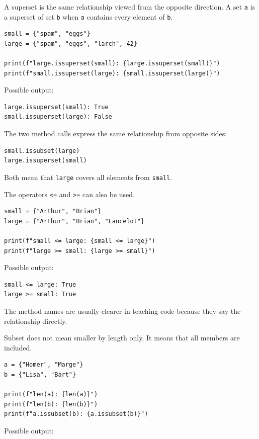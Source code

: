 A superset is the same relationship viewed from the opposite direction. A set \texttt{a} is a superset of set \texttt{b} when \texttt{a} contains every element of \texttt{b}.

\begin{verbatim}
small = {"spam", "eggs"}
large = {"spam", "eggs", "larch", 42}

print(f"large.issuperset(small): {large.issuperset(small)}")
print(f"small.issuperset(large): {small.issuperset(large)}")
\end{verbatim}

Possible output:

\begin{verbatim}
large.issuperset(small): True
small.issuperset(large): False
\end{verbatim}

The two method calls express the same relationship from opposite sides:

\begin{verbatim}
small.issubset(large)
large.issuperset(small)
\end{verbatim}

Both mean that \texttt{large} covers all elements from \texttt{small}.

The operators \texttt{<=} and \texttt{>=} can also be used.

\begin{verbatim}
small = {"Arthur", "Brian"}
large = {"Arthur", "Brian", "Lancelot"}

print(f"small <= large: {small <= large}")
print(f"large >= small: {large >= small}")
\end{verbatim}

Possible output:

\begin{verbatim}
small <= large: True
large >= small: True
\end{verbatim}

The method names are usually clearer in teaching code because they say the relationship directly.

Subset does not mean smaller by length only. It means that all members are included.

\begin{verbatim}
a = {"Homer", "Marge"}
b = {"Lisa", "Bart"}

print(f"len(a): {len(a)}")
print(f"len(b): {len(b)}")
print(f"a.issubset(b): {a.issubset(b)}")
\end{verbatim}

Possible output:


